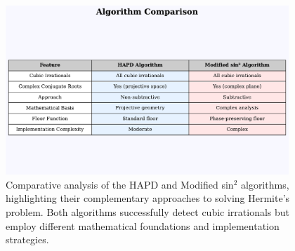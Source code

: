 
\begin{figure}[ht]
\centering
\includegraphics[width=0.95\textwidth]{../figures/output/algorithm_comparison_chart.pdf}

\caption{Comparative analysis of the HAPD and Modified sin$^2$ algorithms, highlighting their complementary approaches to solving Hermite's problem. Both algorithms successfully detect cubic irrationals but employ different mathematical foundations and implementation strategies.}
\label{fig:algorithm_comparison}
\end{figure}